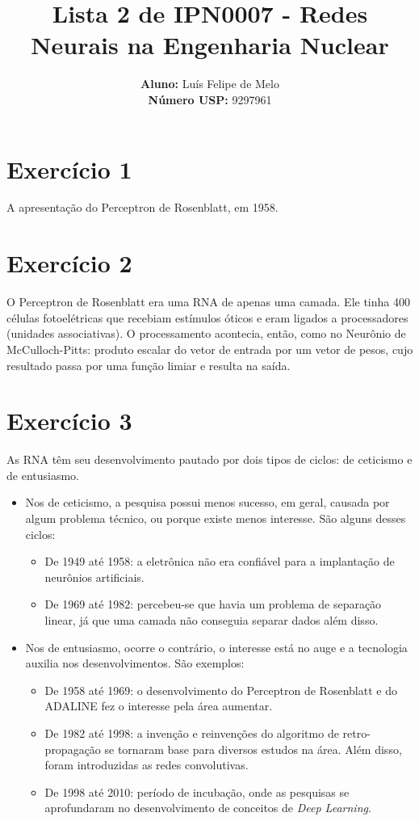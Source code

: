 \documentclass[a4]{article}
\title{\textbf{Lista 2 de IPN0007 - Redes Neurais na Engenharia Nuclear}}
\author{
    \textbf{Aluno:} Luís Felipe de Melo  \\
    \textbf{Número USP:} 9297961
    }
\date{}
\begin{document}
\maketitle

\section*{Exercício 1}

A apresentação do Perceptron de Rosenblatt, em 1958. 

\section*{Exercício 2}

O Perceptron de Rosenblatt era uma RNA de apenas uma camada. Ele tinha 400 células fotoelétricas que recebiam estímulos óticos e eram ligados a processadores (unidades associativas). O processamento acontecia, então, como no Neurônio de McCulloch-Pitts: produto escalar do vetor de entrada por um vetor de pesos, cujo resultado passa por uma função limiar e resulta na saída.

\section*{Exercício 3}

As RNA têm seu desenvolvimento pautado por dois tipos de ciclos: de ceticismo e de entusiasmo.

\begin{itemize}
	\item Nos de ceticismo, a pesquisa possui menos sucesso, em geral, causada por algum problema técnico, ou porque existe menos interesse. São alguns desses ciclos:
	\begin{itemize}
		\item De 1949 até 1958: a eletrônica não era confiável para a implantação de neurônios artificiais.
		\item De 1969 até 1982: percebeu-se que havia um problema de separação linear, já que uma camada não conseguia separar dados além disso.
	\end{itemize}
	\item Nos de entusiasmo, ocorre o contrário, o interesse está no auge e a tecnologia auxilia nos desenvolvimentos. São exemplos:
	\begin{itemize}
		\item De 1958 até 1969: o desenvolvimento do Perceptron de Rosenblatt e do ADALINE fez o interesse pela área aumentar.
		\item De 1982 até 1998: a invenção e reinvenções do algoritmo de retro-propagação se tornaram base para diversos estudos na área. Além disso, foram introduzidas as redes convolutivas.
		\item De 1998 até 2010: período de incubação, onde as pesquisas se aprofundaram no desenvolvimento de conceitos de \textit{Deep Learning}.
	\end{itemize}
\end{itemize}
\end{document}

